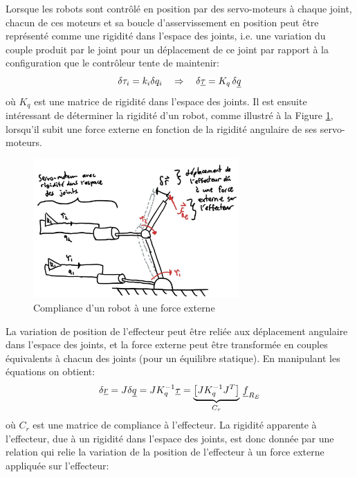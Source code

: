 Lorsque les robots sont contrôlé en position par des servo-moteurs à chaque joint, chacun de ces moteurs et sa boucle d'asservissement en position peut être représenté comme une rigidité dans l'espace des joints, i.e. une variation du couple produit par le joint pour un déplacement de ce joint par rapport à la configuration que le contrôleur tente de maintenir:
\begin{align}
\delta \tau_i = k_i \delta q_i \quad \Rightarrow \quad \delta \underline{\tau} = K_q \, \delta \underline{q}
\end{align}
où $K_q$ est une matrice de rigidité dans l'espace des joints. Il est ensuite intéressant de déterminer la rigidité d'un robot, comme illustré à la Figure \ref{fig:robotcompliance}, lorsqu'il subit une force externe en fonction de la rigidité angulaire de ses servo-moteurs.
\begin{figure}[htbp]
	\centering
		\includegraphics[width=0.70\textwidth]{fig/robotcompliance.jpg}
	\caption{Compliance d'un robot à une force externe}
	\label{fig:robotcompliance}
\end{figure}
La variation de position de l'effecteur peut être reliée aux déplacement angulaire dans l'espace des joints, et la force externe peut être transformée en couples équivalents à chacun des joints (pour un équilibre statique). En manipulant les équations on obtient:
\begin{align}
\delta \underline{r} = J \delta \underline{q} = J K_q^{-1} \underline{\tau} = 
\underbrace{
\left[ J K_q^{-1} J^T \right]
}_{C_r} \,  \underline{f}_{R_E}
\end{align}
où $C_r$ est une matrice de compliance à l'effecteur. La rigidité apparente à l'effecteur, due à un rigidité dans l'espace des joints, est donc donnée par une relation qui relie la variation de la position de l'effecteur à un force externe appliquée sur l'effecteur:
